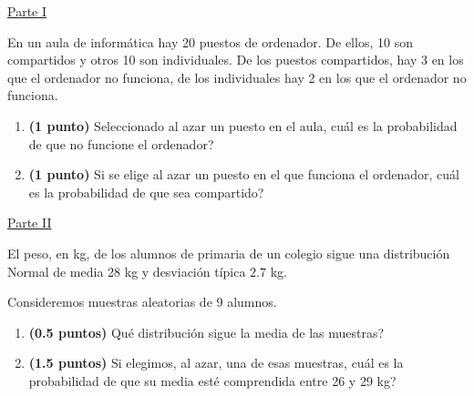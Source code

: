 
\noindent\underline{Parte I}

En un aula de informática hay 20 puestos de ordenador. De ellos, 10 son compartidos y otros 10 son individuales. De los puestos compartidos, hay 3 en los que el ordenador no funciona, de los individuales hay 2 en los que el ordenador no funciona.
\begin{enumerate}[label=\alph*)]
\item \textbf{(1 punto)} Seleccionado al azar un puesto en el aula, \textquestiondown{}cuál es la probabilidad de que no funcione el ordenador?
\item \textbf{(1 punto)} Si se elige al azar un puesto en el que funciona el ordenador, \textquestiondown{}cuál es la probabilidad de que sea compartido?
\end{enumerate}
\par\noindent\begin{minipage}{\linewidth}
\noindent\underline{Parte II}

El peso, en kg, de los alumnos de primaria de un colegio sigue una distribución Normal de media 28 kg y desviación típica $2.7$ kg.

Consideremos muestras aleatorias de 9 alumnos.
\begin{enumerate}[label=\alph*)]
\item \textbf{(0.5 puntos)} \textquestiondown{}Qué distribución sigue la media de las muestras?
\item \textbf{(1.5 puntos)} Si elegimos, al azar, una de esas muestras, \textquestiondown{}cuál es la probabilidad de que su media esté comprendida entre 26 y 29 kg?
\end{enumerate}
\end{minipage}\par
